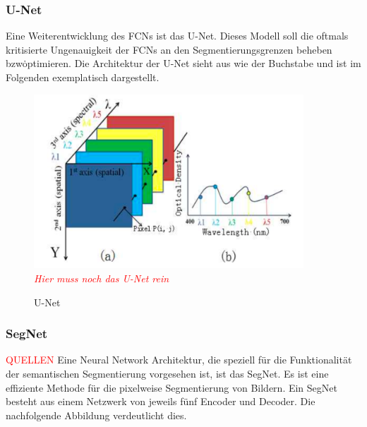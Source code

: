 
\subsubsection{U-Net}

Eine Weiterentwicklung des \ac{FCN}s ist das U-Net.
Dieses Modell soll die oftmals kritisierte Ungenauigkeit der \ac{FCN}s an den Segmentierungsgrenzen beheben bzw\.
optimieren.
Die Architektur der U-Net sieht aus wie der Buchstabe \grqq und ist im Folgenden exemplatisch dargestellt.

\begin{figure}[H]
    \caption {U-Net}
    \label{fig:uNet}
    \includegraphics[width=0.9\textwidth]{abbildungen/datacube_spectral.png}
    \\
    \textit{\textcolor{red}{Hier muss noch das U-Net rein}}
    \\
\end{figure}

\subsubsection{SegNet}
{\textcolor{red}{QUELLEN}}
Eine Neural Network Architektur, die speziell für die Funktionalität der semantischen Segmentierung vorgesehen ist,
ist das SegNet.
Es ist eine effiziente Methode für die pixelweise Segmentierung von Bildern.
Ein SegNet besteht aus einem Netzwerk von jeweils fünf Encoder und Decoder.
Die nachfolgende Abbildung verdeutlicht dies.

